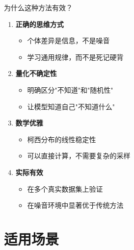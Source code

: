 \documentclass[aspectratio=169,12pt]{beamer}
\begin{document}
\begin{frame}{为什么这种方法有效？}
\begin{enumerate}
    \item \textbf{正确的思维方式}
    \begin{itemize}
        \item 个体差异是信息，不是噪音
        \item 学习通用规律，而不是死记硬背
    \end{itemize}
    
    \item \textbf{量化不确定性}
    \begin{itemize}
        \item 明确区分"不知道"和"随机性"
        \item 让模型知道自己"不知道什么"
    \end{itemize}
    
    \item \textbf{数学优雅}
    \begin{itemize}
        \item 柯西分布的线性稳定性
        \item 可以直接计算，不需要复杂的采样
    \end{itemize}
    
    \item \textbf{实际有效}
    \begin{itemize}
        \item 在多个真实数据集上验证
        \item 在噪音环境中显著优于传统方法
    \end{itemize}
\end{enumerate}
\end{frame}

\section{适用场景}
\end{document}
